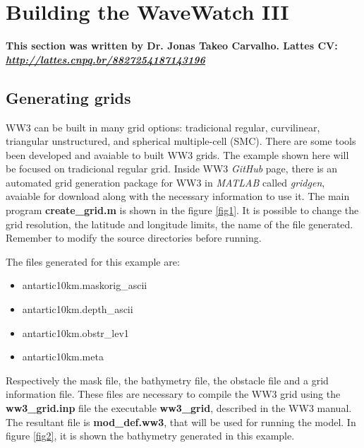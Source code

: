 \bigskip
\chapter{Building the WaveWatch III}

\noindent \textbf{This section was written by Dr. Jonas Takeo Carvalho.  \newline Lattes CV: \textit{\textcolor{bleu_cite}{\href{http://lattes.cnpq.br/8827254187143196}{http://lattes.cnpq.br/8827254187143196}}}} 
\bigskip

\section{Generating grids}
\bigskip

\noindent WW3 can be built in many grid options: tradicional regular, curvilinear, triangular unstructured, and spherical multiple-cell (SMC). 
There are some tools been developed and avaiable to built WW3 grids. The example shown here will be focused on tradicional regular grid. Inside 
WW3 \textit{GitHub} page, there is an automated grid generation package for WW3 in \textit{MATLAB} called \textit{gridgen}, avaiable for download along with
the necessary information to use it. The main program \textbf{create\_grid.m} is shown in the figure \textcolor{bleu_cite}{\ref{fig1}}. It is possible to change the grid resolution, 
the latitude and longitude limits, the name of the file generated. Remember to modify the source directories before running. 
\bigskip

\noindent The files generated for this example are:
\bigskip

\begin{itemize}
    \item antartic10km.maskorig\_ascii
    \item antartic10km.depth\_ascii
    \item antartic10km.obstr\_lev1
    \item antartic10km.meta
\end{itemize}
\bigskip

\noindent Respectively the mask file, the bathymetry file, the obstacle file and a grid information file. These files are necessary to compile the WW3 grid 
using the \textbf{{ww3\_grid.inp}} file the executable \textbf{ww3\_grid}, described in the WW3 manual. The resultant file is \textbf{mod\_def.ww3}, that will 
be used for running the model. In figure \textcolor{bleu_cite}{\ref{fig2}}, it is shown the bathymetry generated in this example.
\bigskip


